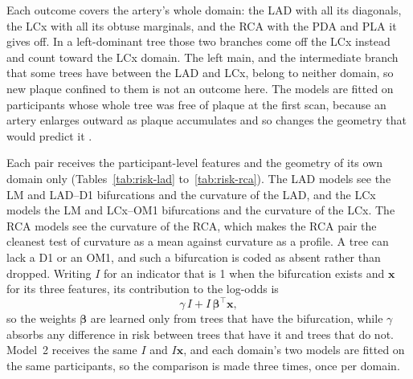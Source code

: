 Each outcome covers the artery's whole domain: the LAD with all its diagonals, the LCx with all its obtuse marginals, and the RCA with the PDA and PLA it gives off.
In a left-dominant tree those two branches come off the LCx instead and count toward the LCx domain.
The left main, and the intermediate branch that some trees have between the LAD and LCx, belong to neither domain, so new plaque confined to them is not an outcome here.
The models are fitted on participants whose whole tree was free of plaque at the first scan, because an artery enlarges outward as plaque accumulates and so changes the geometry that would predict it \cite{glagov1987remodeling}.

Each pair receives the participant-level features and the geometry of its own domain only (Tables~\ref{tab:risk-lad} to~\ref{tab:risk-rca}).
The LAD models see the LM and LAD--D1 bifurcations and the curvature of the LAD, and the LCx models the LM and LCx--OM1 bifurcations and the curvature of the LCx.
The RCA models see the curvature of the RCA, which makes the RCA pair the cleanest test of curvature as a mean against curvature as a profile.
A tree can lack a D1 or an OM1, and such a bifurcation is coded as absent rather than dropped.
Writing $I$ for an indicator that is 1 when the bifurcation exists and $\mathbf{x}$ for its three features, its contribution to the log-odds is
\begin{equation}
  \gamma\, I + I \, \boldsymbol{\beta}^{\top} \mathbf{x},
  \label{eq:risk-presence}
\end{equation}
so the weights $\boldsymbol{\beta}$ are learned only from trees that have the bifurcation, while $\gamma$ absorbs any difference in risk between trees that have it and trees that do not.
Model~2 receives the same $I$ and $I\mathbf{x}$, and each domain's two models are fitted on the same participants, so the comparison is made three times, once per domain.

